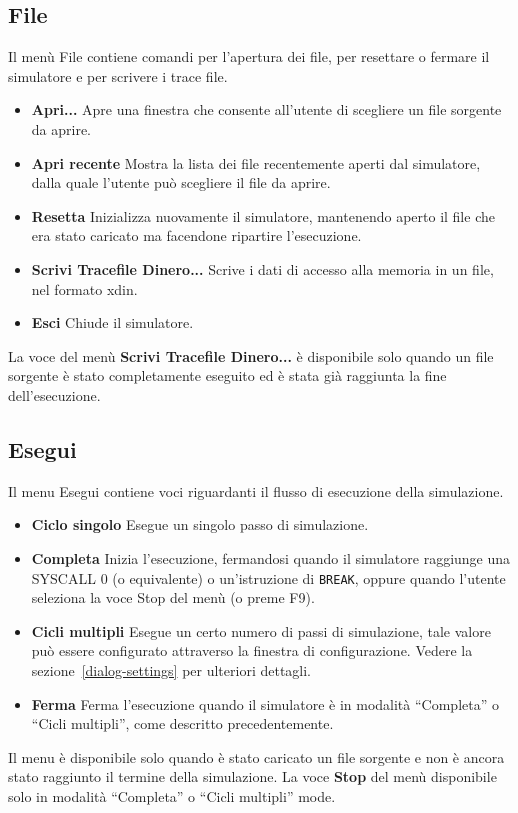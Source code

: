 \documentclass[12pt]{report}
\newcommand{\EM}{EduMIPS64}
\begin{document}
\subsection{File}
Il men\`{u} File contiene comandi per l'apertura dei file, per resettare o fermare il simulatore e per scrivere i trace file.
\begin{itemize}
	\item \textbf{Apri...} Apre una finestra che consente all'utente di scegliere un file sorgente da aprire.
	\item \textbf{Apri recente} Mostra la lista dei file recentemente aperti dal simulatore, dalla quale l'utente pu\`{o} scegliere il file da aprire.
	\item \textbf{Resetta} Inizializza nuovamente il simulatore, mantenendo aperto il file che era stato caricato ma facendone ripartire l'esecuzione.
	\item \textbf{Scrivi Tracefile Dinero...} Scrive i dati di accesso alla memoria in un file, nel formato xdin.
	\item \textbf{Esci} Chiude il simulatore.
\end{itemize}
La voce del men\`{u} \textbf{Scrivi Tracefile Dinero...} \`{e} disponibile solo quando un file sorgente \`{e} 
stato completamente eseguito ed \`{e} stata gi\`{a} raggiunta la fine dell'esecuzione.


\index{\EM{}!menu!Esegui}
\subsection{Esegui}
Il menu Esegui contiene voci riguardanti il flusso di esecuzione della simulazione.
\begin{itemize}
	\item \textbf{Ciclo singolo} Esegue un singolo passo di simulazione.
	\item \textbf{Completa} Inizia l'esecuzione, fermandosi quando il simulatore raggiunge una SYSCALL 0 (o equivalente) o
	un'istruzione di \texttt{BREAK}, oppure quando l'utente seleziona la voce Stop del men\`{u} (o preme F9).  
	\item \textbf{Cicli multipli} Esegue un certo numero di passi di
    simulazione, tale valore pu\`o essere configurato 
	attraverso la finestra di configurazione. Vedere la sezione~\ref{dialog-settings} per ulteriori dettagli.
	\item \textbf{Ferma} Ferma l'esecuzione quando il simulatore \`{e} in
    modalit\`{a} ``Completa'' o ``Cicli multipli'', come descritto precedentemente.
\end{itemize}
Il menu \`{e} disponibile solo quando \`{e} stato caricato un file sorgente e non \`{e} ancora stato raggiunto il termine della simulazione.
La voce \textbf{Stop} del men\`{u}  disponibile solo in modalit\`{a} ``Completa'' o ``Cicli multipli'' mode.
\end{document}
